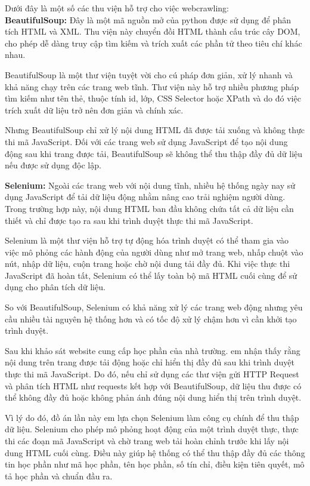 \documentclass[../DoAn.tex]{subfiles}
\begin{document}
Dưới đây là một số các thu viện hỗ trợ cho việc webcrawling:\\
\textbf{BeautifulSoup:}
Đây là một mã nguồn mở của python được sử dụng để phân tích HTML và XML. Thu viện này chuyển đồi HTML thành cấu trúc cây DOM, cho phép dễ dàng truy cập tìm kiếm và trích xuất các phần tử theo tiêu chí khác nhau.

BeautifulSoup là một thư viện tuyệt vời cho cú pháp đơn giản, xử lý nhanh và khả năng chạy trên các trang web tĩnh. Thư viện này hỗ trợ nhiều phương pháp tìm kiếm như tên thẻ, thuộc tính id, lớp, CSS Selector hoặc XPath và do đó việc trích xuất dữ liệu trở nên đơn giản và chính xác.

Nhưng BeautifulSoup chỉ xử lý nội dung HTML đã được tải xuống và không thực thi mã JavaScript. Đối với các trang web sử dụng JavaScript để tạo nội dung động sau khi trang được tải, BeautifulSoup sẽ không thể thu thập đầy đủ dữ liệu nếu được sử dụng độc lập.

\textbf{Selenium:}
Ngoài các trang web với nội dung tĩnh, nhiều hệ thống ngày nay sử dụng JavaScript để tải dữ liệu động nhằm nâng cao trải nghiệm người dùng. Trong trường hợp này, nội dung HTML ban đầu không chứa tất cả dữ liệu cần thiết và chỉ được tạo ra sau khi trình duyệt thực thi mã JavaScript.

Selenium là một thư viện hỗ trợ tự động hóa trình duyệt có thể tham gia vào việc mô phỏng các hành động của người dùng như mở trang web, nhấp chuột vào nút, nhập dữ liệu, cuộn trang hoặc chờ nội dung tải đầy đủ. Khi việc thực thi JavaScript đã hoàn tất, Selenium có thể lấy toàn bộ mã HTML cuối cùng để sử dụng cho phân tích dữ liệu.

So với BeautifulSoup, Selenium có khả năng xử lý các trang web động nhưng yêu cầu nhiều tài nguyên hệ thống hơn và có tốc độ xử lý chậm hơn vì cần khởi tạo trình duyệt.

Sau khi khảo sát website cung cấp học phần của nhà trường. em nhận thấy rằng nội dung trên trang được tải động hoặc chỉ hiển thị đầy đủ sau khi trình duyệt thực thi mã JavaScript. Do đó, nếu chỉ sử dụng các thư viện gửi HTTP Request và phân tích HTML như requests kết hợp với BeautifulSoup, dữ liệu thu được có thể không đầy đủ hoặc không phản ánh đúng nội dung hiển thị trên trình duyệt.

Vì lý do đó, đồ án lần này em  lựa chọn Selenium làm công cụ chính để thu thập dữ liệu. Selenium cho phép mô phỏng hoạt động của một trình duyệt thực, thực thi các đoạn mã JavaScript và chờ trang web tải hoàn chỉnh trước khi lấy nội dung HTML cuối cùng. Điều này giúp hệ thống có thể thu thập đầy đủ các thông tin học phần như mã học phần, tên học phần, số tín chỉ, điều kiện tiên quyết, mô tả học phần và chuẩn đầu ra.
\end{document}
